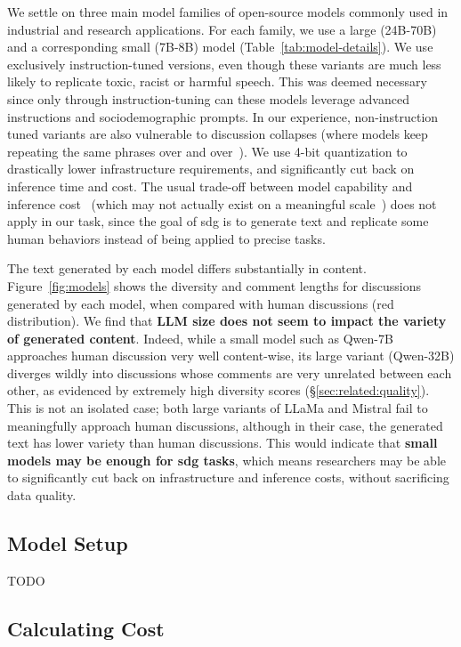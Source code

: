 We settle on three main model families of open-source models commonly used in industrial and research applications. For each family, we use a large (24B-70B) and a corresponding small (7B-8B) model (Table~\ref{tab:model-details}). We use exclusively instruction-tuned versions, even though these variants are much less likely to replicate toxic, racist or harmful speech. This was deemed necessary since only through instruction-tuning can these models leverage advanced instructions and sociodemographic prompts. In our experience, non-instruction tuned variants are also vulnerable to discussion collapses (where models keep repeating the same phrases over and over~\cite{ulmer2024}). We use 4-bit quantization to drastically lower infrastructure requirements, and significantly cut back on inference time and cost. The usual trade-off between model capability and inference cost~\cite{Huang2024} (which may not actually exist on a meaningful scale~\cite{kurtic-etal-2025-give}) does not apply in our task, since the goal of \ac{sdg} is to generate text and replicate some human behaviors instead of  being applied to precise tasks.

The text generated by each model differs substantially in content. Figure~\ref{fig:models} shows the diversity and comment lengths for discussions generated by each model, when compared with human discussions (red distribution). We find that \textbf{LLM size does not seem to impact the variety of generated content}. Indeed, while a small model such as Qwen-7B approaches human discussion very well content-wise, its large variant (Qwen-32B) diverges wildly into discussions whose comments are very unrelated between each other, as evidenced by extremely high diversity scores (\S\ref{sec:related:quality}). This is not an isolated case; both large variants of LLaMa and Mistral fail to meaningfully approach human discussions, although in their case, the generated text has lower variety than human discussions. This would indicate that \textbf{small models may be enough for \ac{sdg} tasks}, which means researchers may be able to significantly cut back on infrastructure and inference costs, without sacrificing data quality.


\subsection{Model Setup}

TODO


\subsection{Calculating Cost}

